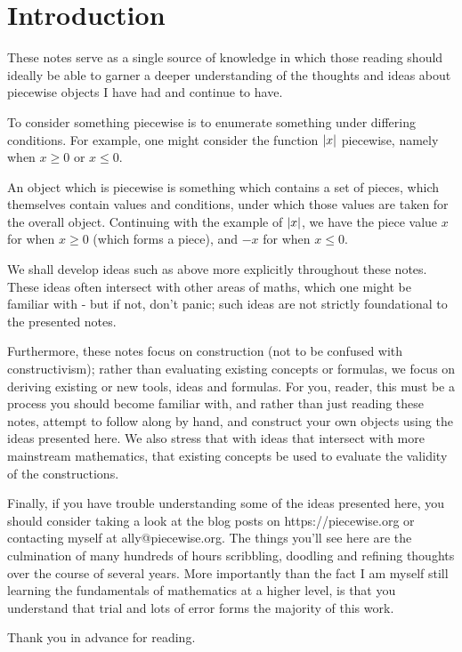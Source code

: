 \section{Introduction}
These notes serve as a single source of knowledge in which those reading should ideally be able to garner a deeper understanding of the thoughts and ideas about piecewise objects I have had and continue to have.

To consider something piecewise is to enumerate something under differing conditions. For example, one might consider the function $\abs{x}$ piecewise, namely when $x\geq 0$ or $x\leq 0$.

An object which is piecewise is something which contains a set of pieces, which themselves contain values and conditions, under which those values are taken for the overall object. Continuing with the example of $\abs{x}$, we have the piece value $x$ for when $x\geq 0$ (which forms a piece), and $-x$ for when $x\leq 0$.

We shall develop ideas such as above more explicitly throughout these notes. These ideas often intersect with other areas of maths, which one might be familiar with - but if not, don't panic; such ideas are not strictly foundational to the presented notes. 

Furthermore, these notes focus on construction (not to be confused with constructivism); rather than evaluating existing concepts or formulas, we focus on deriving existing or new tools, ideas and formulas. For you, reader, this must be a process you should become familiar with, and rather than just reading these notes, attempt to follow along by hand, and construct your own objects using the ideas presented here. We also stress that with ideas that intersect with more mainstream mathematics, that existing concepts be used to evaluate the validity of the constructions.

Finally, if you have trouble understanding some of the ideas presented here, you should consider taking a look at the blog posts on https://piecewise.org or contacting myself at ally@piecewise.org. The things you'll see here are the culmination of many hundreds of hours scribbling, doodling and refining thoughts over the course of several years. More importantly than the fact I am myself still learning the fundamentals of mathematics at a higher level, is that you understand that trial and lots of error forms the majority of this work.

Thank you in advance for reading.

\newpage